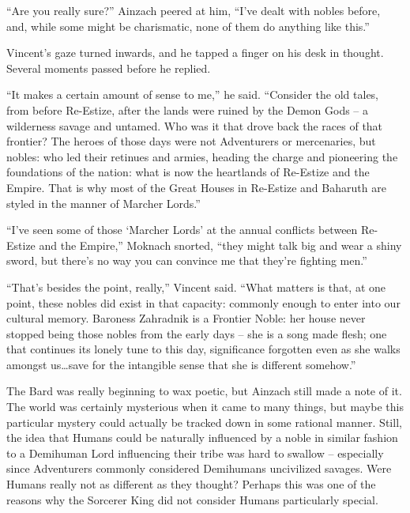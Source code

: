  

“Are you really sure?” Ainzach peered at him, “I’ve dealt with nobles before, and, while some might be charismatic, none of them do anything like this.”

 

Vincent’s gaze turned inwards, and he tapped a finger on his desk in thought. Several moments passed before he replied.

 

“It makes a certain amount of sense to me,” he said. “Consider the old tales, from before Re-Estize, after the lands were ruined by the Demon Gods – a wilderness savage and untamed. Who was it that drove back the races of that frontier? The heroes of those days were not Adventurers or mercenaries, but nobles: who led their retinues and armies, heading the charge and pioneering the foundations of the nation: what is now the heartlands of Re-Estize and the Empire. That is why most of the Great Houses in Re-Estize and Baharuth are styled in the manner of Marcher Lords.”

 

“I’ve seen some of those ‘Marcher Lords’ at the annual conflicts between Re-Estize and the Empire,” Moknach snorted, “they might talk big and wear a shiny sword, but there’s no way you can convince me that they’re fighting men.”

 

“That’s besides the point, really,” Vincent said. “What matters is that, at one point, these nobles did exist in that capacity: commonly enough to enter into our cultural memory. Baroness Zahradnik is a Frontier Noble: her house never stopped being those nobles from the early days – she is a song made flesh; one that continues its lonely tune to this day, significance forgotten even as she walks amongst us…save for the intangible sense that she is different somehow.”

 

The Bard was really beginning to wax poetic, but Ainzach still made a note of it. The world was certainly mysterious when it came to many things, but maybe this particular mystery could actually be tracked down in some rational manner. Still, the idea that Humans could be naturally influenced by a noble in similar fashion to a Demihuman Lord influencing their tribe was hard to swallow – especially since Adventurers commonly considered Demihumans uncivilized savages. Were Humans really not as different as they thought? Perhaps this was one of the reasons why the Sorcerer King did not consider Humans particularly special.


